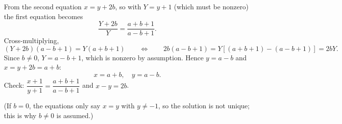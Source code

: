 From the second equation $x=y+2b$, so with $Y=y+1$ (which must be nonzero) the first equation becomes
\[
\dfrac{Y+2b}{Y}=\dfrac{a+b+1}{a-b+1}.
\]
Cross-multiplying,
\[
(Y+2b)(a-b+1)=Y(a+b+1)\qquad\Longleftrightarrow\qquad 2b(a-b+1)=Y\left[(a+b+1)-(a-b+1)\right]=2bY .
\]
Since $b\ne0$, $Y=a-b+1$, which is nonzero by assumption. Hence $y=a-b$ and $x=y+2b=a+b$:
\[
\boxed{x=a+b,\quad y=a-b}.
\]
Check: $\dfrac{x+1}{y+1}=\dfrac{a+b+1}{a-b+1}$ and $x-y=2b$.

(If $b=0$, the equations only say $x=y$ with $y\ne-1$, so the solution is not unique; this is why $b\ne0$ is assumed.)
